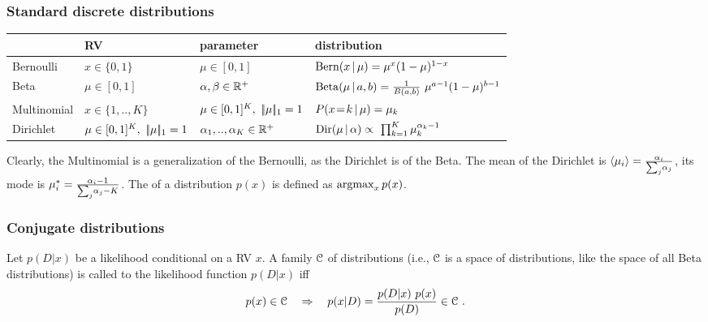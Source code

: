 \subsubsection{Standard discrete distributions}

\begin{tabular}{|p{}|p{}|p{}|p{}|}
\hline
& RV & parameter & distribution \\
\hline
\hline
Bernoulli
& $x \in \{0,1\}$
& $\mu\in [0,1]$
& ${\rm Bern}(x\,|\,\mu) = \mu^x (1-\mu)^{1-x}$ \\
\hline
Beta
& $\mu\in[0,1]$
& $\alpha,\beta \in {\mathbb{R}}^+$
& ${\rm Beta}(\mu\,|\,a,b) = \frac{1}{B(a,b)}~ \mu^{a-1} (1-\mu)^{b-1}$ \\
\hline
Multinomial
& $x \in \{1,..,K\}$
& $\mu \in [0,1]^K,~ |\!|\mu|\!|_1=1$
& \renewcommand{\=}{\!=\!} $P(x\=k\|\m) = \m_k$ \\
\hline
Dirichlet
& $\mu \in [0,1]^K,~ |\!|\mu|\!|_1=1$
& $\alpha_1,..,\alpha_K \in {\mathbb{R}}^+$
& ${\rm Dir}(\mu\,|\,\alpha) \propto~ \textstyle\prod_{k=1}^K \mu_k^{\alpha_k-1}$ \\
\hline
\end{tabular}

Clearly, the Multinomial is a generalization of the Bernoulli, as the
Dirichlet is of the Beta. The mean of the Dirichlet is
$\langle\mu_i\rangle=\frac{\alpha_i}{\sum_j\!\alpha_j}$, its mode is $\mu_i^*
= \frac{\alpha_i-1}{\sum_j\!\alpha_j-K}$. The  of a distribution
$p(x)$ is defined as $\operatorname*{argmax}_x p(x)$.

\subsubsection{Conjugate distributions}

\begin{myDefinition}[Conjugacy]
Let $p(D|x)$ be a likelihood conditional on a RV $x$. A family ${\cal C}$
of distributions (i.e., ${\cal C}$ is a space of distributions, like the
space of all Beta distributions) is called  to the
likelihood function  $p(D|x)$ iff
\begin{equation}
p(x) \in {\cal C} \quad\Rightarrow\quad p(x|D) = \frac{p(D|x)~ p(x)}{p(D)} \in {\cal C} ~.
\end{equation}
\end{myDefinition}

